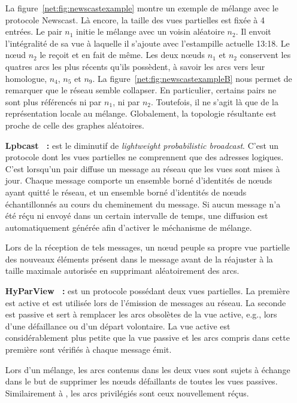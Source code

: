 \begin{itemize}
  La figure~\ref{net:fig:newscastexample} montre un exemple de mélange avec le
  protocole Newscast. Là encore, la taille des vues partielles est fixée à 4
  entrées. Le pair $n_1$ initie le mélange avec un voisin aléatoire $n_2$. Il
  envoit l'intégralité de sa vue à laquelle il s'ajoute avec l'estampille
  actuelle 13:18. Le nœud $n_2$ le reçoit et en fait de même. Les deux nœuds
  $n_1$ et $n_2$ conservent les quatres arcs les plus récents qu'ils possèdent,
  à savoir les arcs vers leur homologue, $n_4$, $n_5$ et $n_9$. La
  figure~\ref{net:fig:newscastexampleB} nous permet de remarquer que le réseau
  semble collapser. En particulier, certains pairs ne sont plus référencés ni
  par $n_1$, ni par $n_2$. Toutefois, il ne s'agit là que de la représentation
  locale au mélange. Globalement, la topologie résultante est proche de celle
  des graphes aléatoires.

\item [\textbf{Lpbcast~\cite{eugster2003lightweight} :}] est le diminutif de
  \emph{lightweight probabilistic broadcast}. C'est un protocole dont les vues
  partielles ne comprennent que des adresses logiques. C'est lorsqu'un pair
  diffuse un message au réseau que les vues sont mises à jour. Chaque message
  comporte un ensemble borné d'identités de nœuds ayant quitté le réseau, et un
  ensemble borné d'identités de nœuds échantillonnés au cours du cheminement du
  message. Si aucun message n'a été réçu ni envoyé dans un certain intervalle de
  temps, une diffusion est automatiquement générée afin d'activer le méchanisme
  de mélange.

  Lors de la réception de tels messages, un nœud peuple sa propre vue partielle
  des nouveaux éléments présent dans le message avant de la réajuster à la
  taille maximale autorisée en supprimant aléatoirement des arcs.

\item [\textbf{HyParView~\cite{leitao2007dependable} :}] est un protocole
  possédant deux vues partielles. La première est active et est utilisée lors de
  l'émission de messages au réseau. La seconde est passive et sert à remplacer
  les arcs obsolètes de la vue active, e.g., lors d'une défaillance ou d'un
  départ volontaire.  La vue active est considérablement plus petite que la vue
  passive et les arcs compris dans cette première sont vérifiés à chaque message
  émit.

  Lors d'un mélange, les arcs contenus dans les deux vues sont sujets à échange
  dans le but de supprimer les nœuds défaillants de toutes les vues
  passives. Similairement à \CYCLON, les arcs privilégiés sont ceux nouvellement
  réçus. 
\end{itemize}



